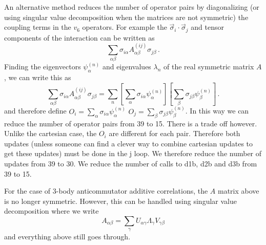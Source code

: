 \documentclass[12pt]{article}
\begin{document}
An alternative method reduces the number of operator pairs by
diagonalizing (or using singular value decomposition when the matrices
are not symmetric) the coupling terms in the $v_6$ operators. For example
the $\vec \sigma_i \cdot \vec \sigma_j$ and tensor components of the interaction
can be written as
\begin{equation}
\sum_{\alpha \beta} \sigma_{i\alpha} A^{(ij)}_{\alpha \beta} \sigma_{j\beta}
\,.
\end{equation}
Finding the eigenvectors $\psi^{(n)}_\alpha$ and eigenvalues $\lambda_n$
of the real symmetric matrix $A$, we can write this as
\begin{equation}
\sum_{\alpha \beta} \sigma_{i\alpha} A^{(ij)}_{\alpha \beta} \sigma_{j\beta}
= \sum_n \left [\sum_\alpha \sigma_{i\alpha} \psi^{(n)}_\alpha \right]
\left [\sum_\beta\sigma_{j\beta} \psi^{(n)}_\beta \right]
\,.
\end{equation}
and therefore define $O_i = \sum_\alpha \sigma_{i\alpha}\psi^{(n)}_\alpha$
$O_j = \sum_\beta \sigma_{j\beta}\psi^{(n)}_\beta$.
In this way we can reduce the number of operator pairs from 39 to 15.
There is a trade off however. Unlike the cartesian case, the $O_i$ are
different for each pair. Therefore both updates (unless
someone can find a clever way to combine cartesian updates to get these
updates) must be done in the j loop. We therefore reduce the
number of updates from 39 to 30. We reduce the number of calls to
d1b, d2b and d3b from 39 to 15.

For the case of 3-body anticommutator additive correlations, the
$A$ matrix above is no longer symmetric. However, this can be
handled using singular value decomposition where we write
\begin{equation}
A_{\alpha\beta} = \sum_\gamma U_{\alpha\gamma} \Lambda_\gamma V_{\gamma \beta}
\end{equation}
and everything above still goes through.
\end{document}
